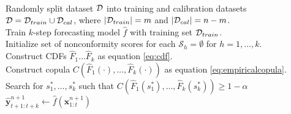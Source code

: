 \begin{algorithm}[t!]
    \hrulefill\\
    Randomly split dataset ${\mathcal{D}}$ into training and calibration datasets ${\mathcal{D}} = \mathcal{D}_{train} \cup \mathcal{D}_{cal}$, where $|\mathcal{D}_{train}| = m$ and $|\mathcal{D}_{cal}| = n-m$.\\
    Train $k$-step forecasting model $\hat{f}$ with   training set $\mathcal{D}_{train}$.\\
    Initialize set of nonconformity scores for each  $\mathcal{S}_h = \emptyset$ for $h=1,\ldots,  k$.\\
    Construct CDFs $\hat{F}_1 \ldots \hat{F}_k$ as equation \ref{eq:cdf}. \\
    Construct copula $C(\hat{F}_1(\cdot), \ldots, \hat{F}_k(\cdot))$ as equation \ref{eq:empiricalcopula}.\\
     Search for $s^*_1, \ldots, s^*_k$  such that $C(\hat{F}_1(s^*_1), \ldots, \hat{F}_k(s^*_k)) \geq 1-\alpha$\\
    $\hat{\mathbf{y}}^{n+1}_{t+1:t+k} \leftarrow \hat{f}(\mathbf{x}_{1:t}^{n+1})$ \\
 \caption{Copula Conformal Time Series Prediction}
 \label{alg:cpts}
\end{algorithm}


